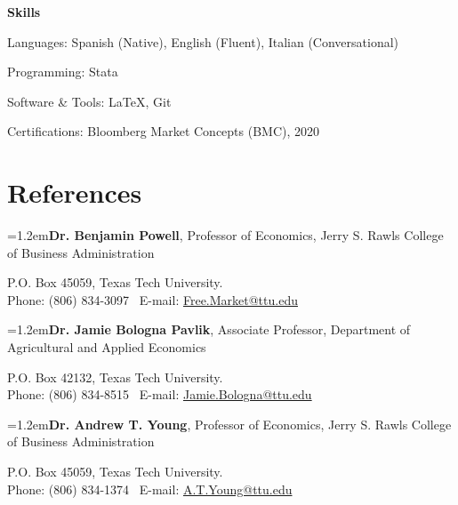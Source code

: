 \documentclass[11pt]{article}
\begin{document}
\textbf{Skills}

Languages: Spanish (Native), English (Fluent), Italian (Conversational)

Programming: Stata

Software \& Tools: \LaTeX{}, Git

Certifications: Bloomberg Market Concepts (BMC), 2020


\section*{References}

{\hangindent=1.2em\noindent\textbf{Dr. Benjamin Powell}, Professor of Economics, Jerry S. Rawls College of Business Administration\par}
\hspace*{1.2em}P.O. Box 45059, Texas Tech University.\\
\hspace*{1.2em}\ifdefined{} Phone: (806) 834-3097 \textperiodcentered\ \fi E-mail: \href{mailto:Free.Market@ttu.edu}{Free.Market@ttu.edu}

\vspace{6pt}
{\hangindent=1.2em\noindent\textbf{Dr. Jamie Bologna Pavlik}, Associate Professor, Department of Agricultural and Applied Economics\par}
\hspace*{1.2em}P.O. Box 42132, Texas Tech University.\\
\hspace*{1.2em}\ifdefined{} Phone: (806) 834-8515 \textperiodcentered\ \fi E-mail: \href{mailto:Jamie.Bologna@ttu.edu}{Jamie.Bologna@ttu.edu}

\vspace{6pt}
{\hangindent=1.2em\noindent\textbf{Dr. Andrew T. Young}, Professor of Economics, Jerry S. Rawls College of Business Administration\par}
\hspace*{1.2em}P.O. Box 45059, Texas Tech University.\\
\hspace*{1.2em}\ifdefined{} Phone: (806) 834-1374 \textperiodcentered\ \fi E-mail: \href{mailto:A.T.Young@ttu.edu}{A.T.Young@ttu.edu}
\end{document}
